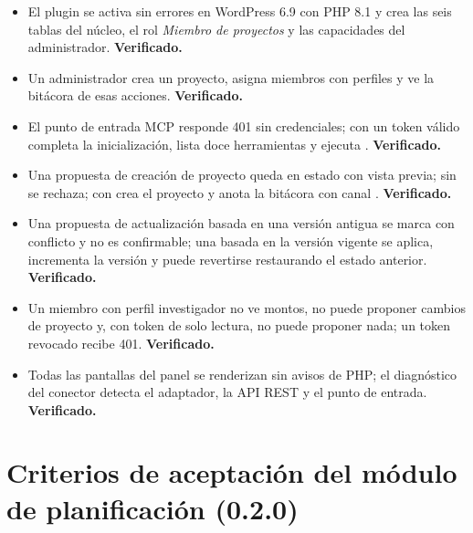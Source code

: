 \documentclass[11pt,a4paper]{article}
\begin{document}
\begin{itemize}
\item El plugin se activa sin errores en WordPress 6.9 con PHP 8.1 y crea las seis tablas del núcleo, el rol \emph{Miembro de proyectos} y las capacidades del administrador. \textbf{Verificado.}
\item Un administrador crea un proyecto, asigna miembros con perfiles y ve la bitácora de esas acciones. \textbf{Verificado.}
\item El punto de entrada MCP responde 401 sin credenciales; con un token válido completa la inicialización, lista doce herramientas y ejecuta . \textbf{Verificado.}
\item Una propuesta de creación de proyecto queda en estado  con vista previa;  sin  se rechaza; con  crea el proyecto y anota la bitácora con canal . \textbf{Verificado.}
\item Una propuesta de actualización basada en una versión antigua se marca con conflicto y no es confirmable; una basada en la versión vigente se aplica, incrementa la versión y puede revertirse restaurando el estado anterior. \textbf{Verificado.}
\item Un miembro con perfil investigador no ve montos, no puede proponer cambios de proyecto y, con token de solo lectura, no puede proponer nada; un token revocado recibe 401. \textbf{Verificado.}
\item Todas las pantallas del panel se renderizan sin avisos de PHP; el diagnóstico del conector detecta el adaptador, la API REST y el punto de entrada. \textbf{Verificado.}
\end{itemize}

\section{Criterios de aceptación del módulo de planificación (0.2.0)}
\end{document}
